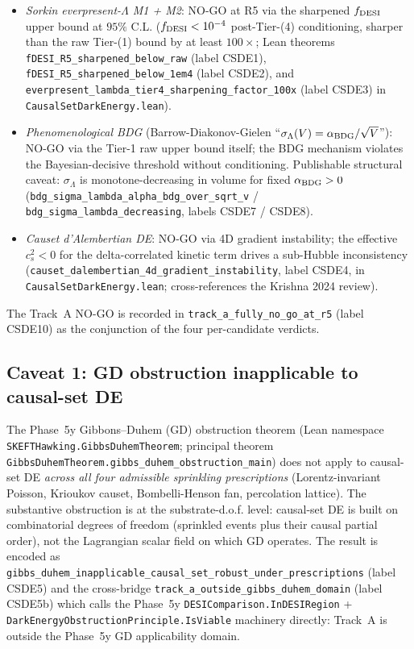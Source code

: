 \documentclass[aps,prd,reprint,nofootinbib,superscriptaddress]{revtex4-2}
\begin{document}
\begin{itemize}
\item \emph{Sorkin everpresent-$\Lambda$ M1 + M2}: NO-GO at R5 via
  the sharpened $f_{\rm DESI}$ upper bound at $95\%$ C.L.
  ($f_{\rm DESI} < 10^{-4}$ post-Tier-(4) conditioning, sharper than
  the raw Tier-(1) bound by at least $100\times$; Lean theorems
  \texttt{fDESI\_R5\_sharpened\_below\_raw} (label CSDE1),
  \texttt{fDESI\_R5\_sharpened\_below\_1em4} (label CSDE2), and
  \texttt{everpresent\_lambda\_tier4\_sharpening\_factor\_100x} (label
  CSDE3) in \texttt{CausalSetDarkEnergy.lean}).
\item \emph{Phenomenological BDG} (Barrow-Diakonov-Gielen
  ``$\sigma_\Lambda(V) = \alpha_{\rm BDG}/\sqrt{V}$''): NO-GO via the
  Tier-1 raw upper bound itself; the BDG mechanism violates the
  Bayesian-decisive threshold without conditioning. Publishable structural
  caveat: $\sigma_\Lambda$ is monotone-decreasing in volume for fixed
  $\alpha_{\rm BDG} > 0$ (\texttt{bdg\_sigma\_lambda\_alpha\_bdg\_over\_sqrt\_v}
  / \texttt{bdg\_sigma\_lambda\_decreasing}, labels CSDE7 / CSDE8).
\item \emph{Causet d'Alembertian DE}: NO-GO via 4D gradient instability;
  the effective $c_s^2 < 0$ for the delta-correlated kinetic term
  drives a sub-Hubble inconsistency
  (\texttt{causet\_dalembertian\_4d\_gradient\_instability}, label CSDE4,
  in \texttt{CausalSetDarkEnergy.lean}; cross-references the
  Krishna 2024 review).
\end{itemize}

The Track~A NO-GO is recorded in \texttt{track\_a\_fully\_no\_go\_at\_r5}
(label CSDE10) as the conjunction of the four per-candidate verdicts.

\subsection{Caveat 1: GD obstruction inapplicable to causal-set DE}
\label{subsec:phase6m-track-a-caveat-gd}

The Phase~5y Gibbons--Duhem (GD) obstruction theorem (Lean namespace
\texttt{SKEFTHawking.GibbsDuhemTheorem}; principal theorem
\texttt{GibbsDuhemTheorem.gibbs\_duhem\_obstruction\_main}) does not
apply to causal-set DE \emph{across all four admissible sprinkling
prescriptions} (Lorentz-invariant Poisson, Krioukov causet, Bombelli-Henson
fan, percolation lattice). The substantive obstruction is at the
substrate-d.o.f. level: causal-set DE is built on combinatorial degrees
of freedom (sprinkled events plus their causal partial order), not the
Lagrangian scalar field on which GD operates. The result is encoded as
\texttt{gibbs\_duhem\_inapplicable\_causal\_set\_robust\_under\_prescriptions}
(label CSDE5) and the cross-bridge
\texttt{track\_a\_outside\_gibbs\_duhem\_domain} (label CSDE5b) which
calls the Phase~5y \texttt{DESIComparison.InDESIRegion} +
\texttt{DarkEnergyObstructionPrinciple.IsViable} machinery directly:
Track~A is outside the Phase~5y GD applicability domain.
\end{document}
